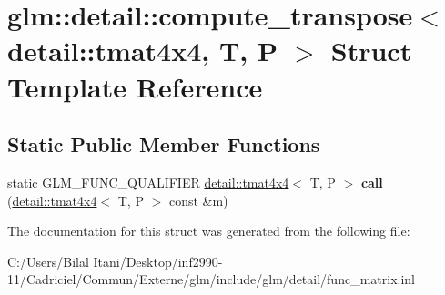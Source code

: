 \hypertarget{structglm_1_1detail_1_1compute__transpose_3_01detail_1_1tmat4x4_00_01_t_00_01_p_01_4}{}\section{glm\+:\+:detail\+:\+:compute\+\_\+transpose$<$ detail\+:\+:tmat4x4, T, P $>$ Struct Template Reference}
\label{structglm_1_1detail_1_1compute__transpose_3_01detail_1_1tmat4x4_00_01_t_00_01_p_01_4}
\subsection*{Static Public Member Functions}
\begin{DoxyCompactItemize}
\item 
static G\+L\+M\+\_\+\+F\+U\+N\+C\+\_\+\+Q\+U\+A\+L\+I\+F\+I\+ER \hyperlink{structglm_1_1detail_1_1tmat4x4}{detail\+::tmat4x4}$<$ T, P $>$ {\bfseries call} (\hyperlink{structglm_1_1detail_1_1tmat4x4}{detail\+::tmat4x4}$<$ T, P $>$ const \&m)\hypertarget{structglm_1_1detail_1_1compute__transpose_3_01detail_1_1tmat4x4_00_01_t_00_01_p_01_4_af9f856179336704a2eab5c72c6ef79e4}{}\label{structglm_1_1detail_1_1compute__transpose_3_01detail_1_1tmat4x4_00_01_t_00_01_p_01_4_af9f856179336704a2eab5c72c6ef79e4}

\end{DoxyCompactItemize}


The documentation for this struct was generated from the following file\+:\begin{DoxyCompactItemize}
\item 
C\+:/\+Users/\+Bilal Itani/\+Desktop/inf2990-\/11/\+Cadriciel/\+Commun/\+Externe/glm/include/glm/detail/func\+\_\+matrix.\+inl\end{DoxyCompactItemize}
